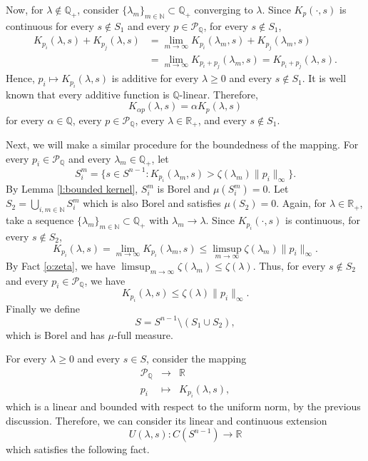 \documentclass[11pt, a4paper]{amsart}
\newcommand{\sn}{{S^{n-1}}}
\newcommand{\poly}{\mathcal P_{\mathbb Q}}
\begin{document}
Now, for $\lambda\not\in\mathbb{Q}_{\scriptscriptstyle +}$, consider $\{\lambda_m\}_{m\in\mathbb{N}}\subset\mathbb{Q}_{\scriptscriptstyle +}$ converging to $\lambda$.
Since $K_{p}(\cdot,s)$ is continuous for every $s\not\in S_1$ and every $p\in\poly$,  for every $s\not\in S_1$,
\begin{align*}
    K_{p_i}(\lambda,s)+K_{p_j}(\lambda,s)&=\lim_{m\to\infty}K_{p_i}(\lambda_m,s)+K_{p_j}(\lambda_m,s)\\
    &=\lim_{m\to\infty}K_{p_i+p_j}(\lambda_m,s)=K_{p_i+p_j}(\lambda,s).
\end{align*}
Hence, $p_i\mapsto K_{p_i}(\lambda,s)$ is additive for every $\lambda\geq 0$ and every $s\not\in S_1$. It is well known that every additive function is $\mathbb{Q}$-linear. Therefore, 
\[
    K_{\alpha p}(\lambda,s)=\alpha K_p(\lambda,s)
\]
for every $\alpha\in\mathbb{Q}$, every $p\in\poly$, every $\lambda\in\mathbb{R}_{\scriptscriptstyle +}$, and every $s\not\in S_1$.



Next, we will make a similar procedure for the boundedness of the mapping. For every $p_i\in\poly$ and every $\lambda_m\in\mathbb{Q}_{\scriptscriptstyle +}$, let 
\[
  S^{m}_i= \{s\in\sn: K_{p_i}(\lambda_m,s) >\zeta(\lambda_m)\|p_i\|_{\scriptscriptstyle \infty} \}.
\]
By Lemma \ref{l:bounded kernel}, $S^{m}_i$ is Borel and $\mu(S^m_i)=0$. Let $S_2=\bigcup_{i,m\in\mathbb{N}}S^m_i$ which is also Borel and satisfies $\mu(S_2)=0$. Again, for $\lambda\in\mathbb{R}_{\scriptscriptstyle +}$, take a sequence $\{\lambda_m\}_{m\in\mathbb{N}}\subset\mathbb{Q}_{\scriptscriptstyle +}$ with $\lambda_m\to\lambda$. Since $K_{p_i}(\cdot,s)$ is continuous, for every $s\not\in S_2$,
\[
    K_{p_i}(\lambda,s)=\lim_{m\to\infty}K_{p_i}(\lambda_m,s)\leq \limsup_{m\to\infty}\zeta(\lambda_m) \|p_i\|_{\scriptscriptstyle \infty}.
\]
By Fact \ref{o:zeta}, we have $\limsup_{m\to\infty}\zeta(\lambda_m)\leq \zeta(\lambda)$. Thus, for every $s\not\in S_2$ and every $p_i\in\poly$, we have
\[
    K_{p_i}(\lambda,s)\leq \zeta (\lambda)\|p_i\|_{\scriptscriptstyle \infty}.
\]
Finally we define 
\begin{equation}\label{eq_set}
  S=\sn\setminus \left(S_1\cup S_2\right),
\end{equation}
which is Borel and has $\mu$-full measure.

For every $\lambda\geq 0$ and every $s\in S$, consider the mapping 
\[
    \begin{array}{ccl}
         \poly &\longrightarrow &\mathbb{R} \\
         p_i&\longmapsto &K_{p_i}(\lambda,s),
    \end{array}
\]
which is a linear and bounded with respect to the uniform norm, by the previous discussion. Therefore, we can consider its linear and continuous extension 
\begin{equation}\label{def:U}
U(\lambda,s):C(\sn)\to\mathbb{R}    
\end{equation} 
which satisfies the following fact.
\end{document}
